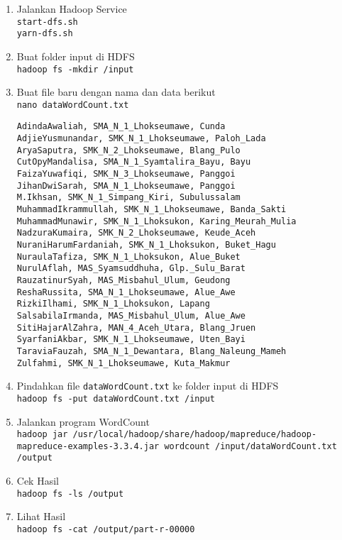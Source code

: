 \documentclass[a4paper]{tufte-handout}
\begin{document}
\begin{enumerate}
\item Jalankan Hadoop Service \\
{\tt start-dfs.sh} \\
{\tt yarn-dfs.sh}

\item Buat folder input di HDFS\\
{\tt hadoop fs -mkdir /input}

\item Buat file baru dengan nama dan data berikut \\
{\tt nano dataWordCount.txt}
\begin{lstlisting}
AdindaAwaliah, SMA_N_1_Lhokseumawe, Cunda
AdjieYusmunandar, SMK_N_1_Lhokseumawe, Paloh_Lada
AryaSaputra, SMK_N_2_Lhokseumawe, Blang_Pulo
CutOpyMandalisa, SMA_N_1_Syamtalira_Bayu, Bayu
FaizaYuwafiqi, SMK_N_3_Lhokseumawe, Panggoi
JihanDwiSarah, SMA_N_1_Lhokseumawe, Panggoi
M.Ikhsan, SMK_N_1_Simpang_Kiri, Subulussalam
MuhammadIkrammullah, SMK_N_1_Lhokseumawe, Banda_Sakti
MuhammadMunawir, SMK_N_1_Lhoksukon, Karing_Meurah_Mulia
NadzuraKumaira, SMK_N_2_Lhokseumawe, Keude_Aceh
NuraniHarumFardaniah, SMK_N_1_Lhoksukon, Buket_Hagu
NuraulaTafiza, SMK_N_1_Lhoksukon, Alue_Buket
NurulAflah, MAS_Syamsuddhuha, Glp._Sulu_Barat
RauzatinurSyah, MAS_Misbahul_Ulum, Geudong
ReshaRussita, SMA_N_1_Lhokseumawe, Alue_Awe
RizkiIlhami, SMK_N_1_Lhoksukon, Lapang
SalsabilaIrmanda, MAS_Misbahul_Ulum, Alue_Awe
SitiHajarAlZahra, MAN_4_Aceh_Utara, Blang_Jruen
SyarfaniAkbar, SMK_N_1_Lhokseumawe, Uten_Bayi
TaraviaFauzah, SMA_N_1_Dewantara, Blang_Naleung_Mameh
Zulfahmi, SMK_N_1_Lhokseumawe, Kuta_Makmur
\end{lstlisting}

\item Pindahkan file {\tt dataWordCount.txt} ke folder input di HDFS \\
{\tt hadoop fs -put dataWordCount.txt /input}

\item Jalankan program WordCount \\
{\tt hadoop jar /usr/local/hadoop/share/hadoop/mapreduce/hadoop-mapreduce-examples-3.3.4.jar wordcount /input/dataWordCount.txt /output}

\item Cek Hasil \\
{\tt hadoop fs -ls /output}

\item Lihat Hasil \\
{\tt hadoop fs -cat /output/part-r-00000}
\end{enumerate}
\end{document}
